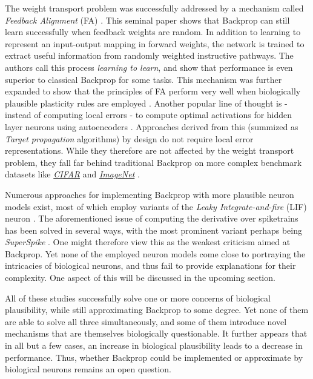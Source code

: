 \noindent The weight transport problem was successfully addressed by a mechanism called \textit{Feedback Alignment} (FA)
\citep{Lillicrap2014}. This seminal paper shows that Backprop can still learn successfully when feedback weights are
random. In addition to learning to represent an input-output mapping in forward weights, the network is trained to
extract useful information from randomly weighted instructive pathways. The authors call this process \textit{learning
to learn}, and show that performance is even superior to classical Backprop for some tasks. This mechanism was further
expanded to show that the principles of FA perform very well when biologically plausible plasticity rules are employed
\citep{Liao2016,Zenke2018}. Another popular line of thought is - instead of computing local errors - to compute optimal
activations for hidden layer neurons using autoencoders \citep{Bengio2014,Lee2015,Ahmad2020}. Approaches derived from
this (summized as \textit{Target propagation} algorithms) by design do not require local error representations. While
they therefore are not affected by the weight transport problem, they fall far behind traditional Backprop on more
complex benchmark datasets like \textit{\href{https://www.cs.toronto.edu/~kriz/cifar.html}{CIFAR}} and
\textit{\href{https://www.image-net.org/index.php}{ImageNet}} \citep{Bartunov2018}.\newline

\noindent Numerous approaches for implementing Backprop with more plausible neuron models exist, most of which employ
variants of the \textit{Leaky Integrate-and-fire} (LIF) neuron \citep{Sporea2013,Lee2016,Bengio2017,Lee2020}. The
aforementioned issue of computing the derivative over spiketrains has been solved in several ways, with the most
prominent variant perhaps being \textit{SuperSpike} \citep{Zenke2018}. One might therefore view this as the weakest
criticism aimed at Backprop. Yet none of the employed neuron models come close to portraying the intricacies of
biological neurons, and thus fail to provide explanations for their complexity. One aspect of this will be discussed in
the upcoming section.\newline

\noindent All of these studies successfully solve one or more concerns of biological plausibility, while still
approximating Backprop to some degree. Yet none of them are able to solve all three simultaneously, and some of them
introduce novel mechanisms that are themselves biologically questionable. It further appears that in all but a few
cases, an increase in biological plausibility leads to a decrease in performance. Thus, whether Backprop could be
implemented or approximate by biological neurons remains an open question.

